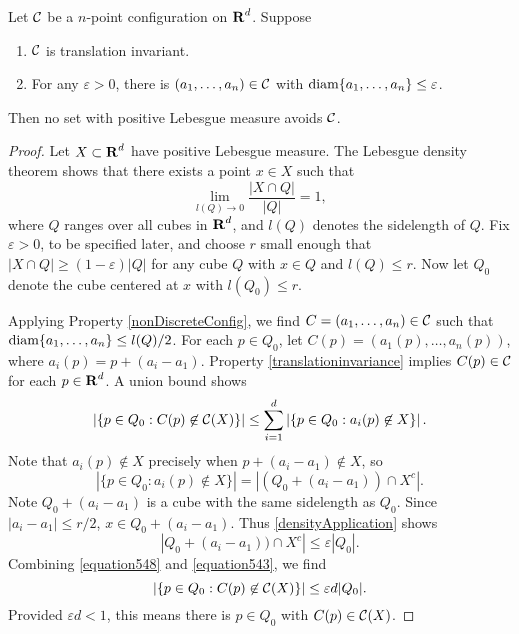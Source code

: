 \begin{theorem}
	Let $\operatorname{\mathcal{C}}$ be a $n$-point configuration on $\operatorname{\mathbf{R}}^d$. Suppose
	\begin{enumerate}
		\item \label{translationinvariance} $\operatorname{\mathcal{C}}$ is translation invariant.
		\item \label{nonDiscreteConfig} For any $\varepsilon > 0$, there is $(a_1, \dots, a_n) \in \operatorname{\mathcal{C}}$ with $\operatorname{\text{diam}} \{ a_1, \dots, a_n \} \leq \varepsilon$.
	\end{enumerate}
	Then no set with positive Lebesgue measure avoids $\operatorname{\mathcal{C}}$.
\end{theorem}
\begin{proof}
	Let $X \subset \operatorname{\mathbf{R}}^d$ have positive Lebesgue measure. The Lebesgue density theorem shows that there exists a point $x \in X$ such that
	\begin{equation} \label{densityApplication} \lim_{l(Q) \to 0} \frac{|X \cap Q|}{|Q|} = 1, \end{equation}
	where $Q$ ranges over all cubes in $\operatorname{\mathbf{R}}^d$, and $l(Q)$ denotes the sidelength of $Q$. Fix $\varepsilon > 0$, to be specified later, and choose $r$ small enough that $|X \cap Q| \geq (1 - \varepsilon) |Q|$ for any cube $Q$ with $x \in Q$ and $l(Q) \leq r$. Now let $Q_0$ denote the cube centered at $x$ with $l(Q_0) \leq r$.

	Applying Property \ref{nonDiscreteConfig}, we find $C = (a_1, \dots, a_n) \in \operatorname{\mathcal{C}}$ such that $\operatorname{\text{diam}} \{ a_1, \dots, a_n \} \leq l(Q)/2$. For each $p \in Q_0$, let $C(p) = (a_1(p), \dots, a_n(p))$, where $a_i(p) = p + (a_i - a_1)$. Property \ref{translationinvariance} implies $C(p) \in \operatorname{\mathcal{C}}$ for each $p \in \operatorname{\mathbf{R}}^d$. A union bound shows
	\begin{equation} \label{equation548} \left| \{ p \in Q_0 : C(p) \not \in \operatorname{\mathcal{C}}(X) \} \right| \leq \sum_{i = 1}^d \left| \{ p \in Q_0 : a_i(p) \not \in X \} \right|.
	\end{equation}
	Note that $a_i(p) \not \in X$ precisely when $p + (a_i - a_1) \not \in X$, so
	\[ |\{ p \in Q_0 : a_i(p) \not \in X \}| = |(Q_0 + (a_i - a_1)) \cap X^c|. \]
	Note $Q_0 + (a_i - a_1)$ is a cube with the same sidelength as $Q_0$. Since $|a_i - a_1| \leq r/2$, $x \in Q_0 + (a_i - a_1)$. Thus \eqref{densityApplication} shows
	\begin{equation} \label{equation543} |Q_0 + (a_i - a_1)) \cap X^c| \leq \varepsilon |Q_0|. \end{equation}
	Combining \eqref{equation548} and \eqref{equation543}, we find
	\[ \left| \{ p \in Q_0 : C(p) \not \in \operatorname{\mathcal{C}}(X) \} \right| \leq \varepsilon d |Q_0|. \]
	Provided $\varepsilon d < 1$, this means there is $p \in Q_0$ with $C(p) \in \operatorname{\mathcal{C}}(X)$.
\end{proof}

